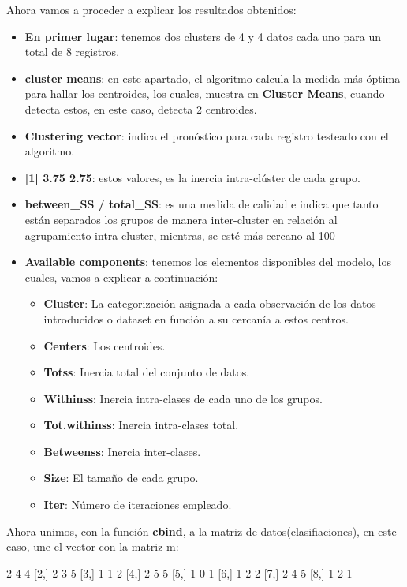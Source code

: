 \documentclass [a4paper] {article}
\begin{document}
Ahora vamos a proceder a explicar los resultados obtenidos:
\begin{itemize}
	\item \textbf{En primer lugar}: tenemos dos clusters de 4 y 4 datos cada uno para un total de 8 registros.
	\item \textbf{cluster means}: en este apartado, el algoritmo calcula la medida más óptima para hallar
	los centroides, los cuales, muestra en \textbf{Cluster Means}, cuando detecta estos, en este caso,
	detecta 2 centroides. 
	\item \textbf{Clustering vector}: indica el pronóstico para cada registro testeado con el algoritmo.
	\item \textbf{[1] 3.75 2.75}: estos valores, es la inercia intra-clúster de cada grupo.
	\item \textbf{between\_SS / total\_SS}: es una medida de calidad e indica que tanto están separados los
	grupos de manera inter-cluster en relación al agrupamiento intra-cluster, mientras, se esté más cercano
	al 100%
	\item \textbf{Available components}: tenemos los elementos disponibles del modelo, los cuales, vamos a explicar a continuación:
	\begin{itemize}
		\item \textbf{Cluster}: La categorización asignada a cada observación de los datos introducidos o dataset
		en función a su cercanía a estos centros.
		\item \textbf{Centers}: Los centroides.
		\item \textbf{Totss}: Inercia total del conjunto de datos.
		\item \textbf{Withinss}: Inercia intra-clases de cada uno de los grupos.
		\item \textbf{Tot.withinss}: Inercia intra-clases total.
		\item \textbf{Betweenss}: Inercia inter-clases.
		\item \textbf{Size}: El tamaño de cada grupo.
		\item \textbf{Iter}: Número de iteraciones empleado.
	\end{itemize}
\end{itemize}

Ahora unimos, con la función \textbf{cbind}, a la matriz de datos(clasifiaciones), en este caso, une el vector
con la matriz m:

\begin{Schunk}
\begin{Soutput}
     [,1] [,2] [,3]
[1,]    2    4    4
[2,]    2    3    5
[3,]    1    1    2
[4,]    2    5    5
[5,]    1    0    1
[6,]    1    2    2
[7,]    2    4    5
[8,]    1    2    1
\end{Soutput}
\end{Schunk}
\end{document}
